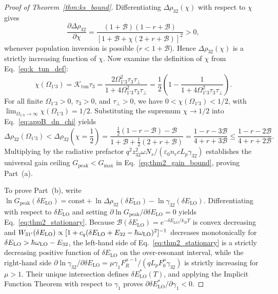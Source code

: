 \documentclass[11pt,letterpaper]{article}
\renewcommand{\hbar}{\mathchar'26\mkern-9mu h}
\begin{document}
\begin{proof}[Proof of Theorem~\ref{thm:ks_bound}]
Differentiating $\Delta\rho_{32}(\chi)$ with respect to $\chi$ gives
\begin{equation}
\frac{\partial \Delta\rho_{32}}{\partial \chi} = \frac{(1 + \mathcal{B})(1 - r + \mathcal{B})}{\left[1 + \mathcal{B} + \chi(2 + r + \mathcal{B})\right]^2} > 0,
\label{eq:appB_ddn_dchi}
\end{equation}
whenever population inversion is possible ($r < 1 + \mathcal{B}$). Hence $\Delta\rho_{32}(\chi)$ is a strictly increasing function of $\chi$. Now examine the definition of $\chi$ from Eq.~\eqref{eq:k_tun_def}:
\begin{equation}
\chi(\Omega_{1'3}) = \mathcal{K}_{\mathrm{tun}}\tau_3 = \frac{2\Omega_{1'3}^2 \tau_3 \tau_\perp}{1 + 4\Omega_{1'3}^2 \tau_3 \tau_\perp} = \frac{1}{2}\left(1 - \frac{1}{1 + 4\Omega_{1'3}^2 \tau_3 \tau_\perp}\right).
\label{eq:appB_chi_bound}
\end{equation}
For all finite $\Omega_{1'3} > 0$, $\tau_3 > 0$, and $\tau_\perp > 0$, we have $0 < \chi(\Omega_{1'3}) < 1/2$, with $\lim_{\Omega_{1'3}\to\infty}\chi(\Omega_{1'3}) = 1/2$. Substituting the supremum $\chi \to 1/2$ into Eq.~\eqref{eq:appB_dn_chi} yields
\begin{equation}
\Delta\rho_{32}(\Omega_{1'3}) < \Delta\rho_{32}\!\left(\chi = \frac{1}{2}\right) = \frac{\frac{1}{2}(1 - r - \mathcal{B}) - \mathcal{B}}{1 + \mathcal{B} + \frac{1}{2}(2 + r + \mathcal{B})} = \frac{1 - r - 3\mathcal{B}}{4 + r + 3\mathcal{B}} \le \frac{1 - r - 2\mathcal{B}}{4 + r + 2\mathcal{B}}.
\label{eq:appB_supremum}
\end{equation}
Multiplying by the radiative prefactor $q^2 z_{32}^2 \omega N_s / (\varepsilon_0 n_r c L_p \gamma_{32})$ establishes the universal gain ceiling $G_{\mathrm{peak}} < G_{\max}$ in Eq.~\eqref{eq:thm2_gain_bound}, proving Part~(a).

To prove Part~(b), write $\ln G_{\mathrm{peak}}(\delta E_{\mathrm{LO}}) = \mathrm{const} + \ln \Delta\rho_{32}(\delta E_{\mathrm{LO}}) - \ln \gamma_{32}(\delta E_{\mathrm{LO}})$. Differentiating with respect to $\delta E_{\mathrm{LO}}$ and setting $\partial \ln G_{\mathrm{peak}}/\partial \delta E_{\mathrm{LO}} = 0$ yields Eq.~\eqref{eq:thm2_stationary}. Because $\mathcal{B}(\delta E_{\mathrm{LO}}) = e^{-\delta E_{\mathrm{LO}}/k_B T}$ is convex decreasing and $W_{31'}(\delta E_{\mathrm{LO}}) \propto [1 + c_q(\delta E_{\mathrm{LO}} + E_{32} - \hbar\omega_{\mathrm{LO}})^2]^{-1}$ decreases monotonically for $\delta E_{\mathrm{LO}} > \hbar\omega_{\mathrm{LO}} - E_{32}$, the left-hand side of Eq.~\eqref{eq:thm2_stationary} is a strictly decreasing positive function of $\delta E_{\mathrm{LO}}$ on the over-resonant interval, while the right-hand side $\partial \ln \gamma_{32}/\partial \delta E_{\mathrm{LO}} = \mu \gamma_1 F_R^{\mu-1}/(q L_p F_0^\mu \gamma_{32})$ is strictly increasing for $\mu > 1$. Their unique intersection defines $\delta E_{\mathrm{LO}}^*(T)$, and applying the Implicit Function Theorem with respect to $\gamma_1$ proves $\partial \delta E_{\mathrm{LO}}^*/\partial \gamma_1 < 0$.
\end{proof}
\end{document}
